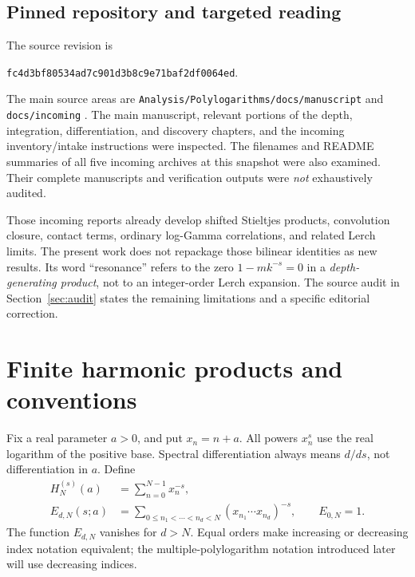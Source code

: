 \documentclass[11pt]{article}
\numberwithin{equation}{section}
\theoremstyle{definition}\newtheorem{definition}[theorem]{Definition}
\theoremstyle{remark}\newtheorem{remark}[theorem]{Remark}
\newcommand{\pin}{\texttt{fc4d3bf80534ad7c901d3b8c9e71baf2df0064ed}}
\newcommand{\src}[1]{\nolinkurl{#1}}
\begin{document}
\subsection{Pinned repository and targeted reading}
The source revision is
\begin{center}\small\pin.\end{center}
The main source areas are
\src{Analysis/Polylogarithms/docs/manuscript} and \src{docs/incoming}
\cite{ProveIt}. The main manuscript, relevant portions of the depth,
integration, differentiation, and discovery chapters, and the incoming
inventory/intake instructions were inspected. The filenames and README
summaries of all five incoming archives at this snapshot were also examined.
Their complete manuscripts and verification outputs were \emph{not}
exhaustively audited.

Those incoming reports already develop shifted Stieltjes products,
convolution closure, contact terms, ordinary log-Gamma correlations, and
related Lerch limits. The present work does not repackage those bilinear
identities as new results. Its word ``resonance'' refers to the zero
$1-mk^{-s}=0$ in a \emph{depth-generating product}, not to an integer-order
Lerch expansion. The source audit in Section~\ref{sec:audit} states the
remaining limitations and a specific editorial correction.

\section{Finite harmonic products and conventions}
\label{sec:finite}
Fix a real parameter $a>0$, and put $x_n=n+a$. All powers $x_n^s$ use the real
logarithm of the positive base. Spectral differentiation always means
$d/ds$, not differentiation in $a$. Define
\begin{align}
 H_N^{(s)}(a)&=\sum_{n=0}^{N-1}x_n^{-s},\\
 E_{d,N}(s;a)&=\sum_{0\le n_1<\cdots<n_d<N}
                (x_{n_1}\cdots x_{n_d})^{-s},\qquad E_{0,N}=1.
 \label{eq:finiteE}
\end{align}
The function $E_{d,N}$ vanishes for $d>N$. Equal orders make increasing or
decreasing index notation equivalent; the multiple-polylogarithm notation
introduced later will use decreasing indices.
\end{document}
